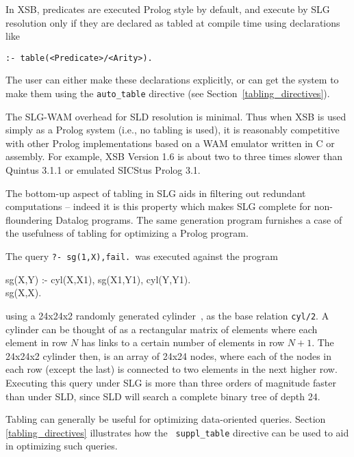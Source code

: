 In XSB, predicates are executed Prolog style by default, and execute
by SLG resolution only if they are declared as tabled at compile time
using declarations like
\begin{center}
{\tt :- table(<Predicate>/<Arity>).}
\end{center}
The user can either make these declarations explicitly, or can get the
system to make them using the {\tt auto\_table} directive (see
Section~\ref{tabling_directives}).

The SLG-WAM overhead for SLD resolution is minimal.  Thus when XSB is
used simply as a Prolog system (i.e., no tabling is used), it is
reasonably competitive with other Prolog implementations based on a
WAM emulator written in C or assembly.  For example, XSB Version 1.6
is about two to three times slower than Quintus 3.1.1 or emulated
SICStus Prolog 3.1.

The bottom-up aspect of tabling in SLG aids in filtering out redundant
computations -- indeed it is this property which makes SLG complete
for non-floundering Datalog programs.  The same generation program
furnishes a case of the usefulness of tabling for optimizing a Prolog
program.
\begin{example} \label{ex:same-gen} {\rm
The query {\tt ?- sg(1,X),fail.}\ was executed against the program
\begin{center}
\begin{Prog}
    sg(X,Y) :- cyl(X,X1), sg(X1,Y1), cyl(Y,Y1).	\\
    sg(X,X).
\end{Prog}
\end{center}
using a 24x24x2 randomly generated cylinder~\cite{BaRa86}, as the base
relation {\tt cyl/2}.  A cylinder can be thought of as a rectangular
matrix of elements where each element in row $N$ has links to a
certain number of elements in row $N+1$.  The 24x24x2 cylinder then,
is an array of 24x24 nodes, where each of the nodes in each row
(except the last) is connected to two elements in the next higher row.
Executing this query under SLG is more than three orders of magnitude
faster than under SLD, since SLD will search a complete binary tree of
depth 24.  }
\end{example}

Tabling can generally be useful for optimizing data-oriented queries.
Section \ref{tabling_directives} illustrates how the {\tt
suppl\_table} directive can be used to aid in optimizing such queries.

